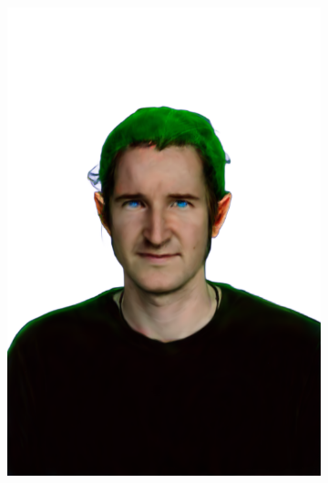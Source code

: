 \begin{figure}
\begin{subfigure}{0.18\linewidth}
        \includegraphics[width=\textwidth]{Figures/results/low/ephra_elf/2_render.png}
	\end{subfigure}
    \begin{subfigure}{0.18\linewidth}

\end{subfigure}
\end{figure}
